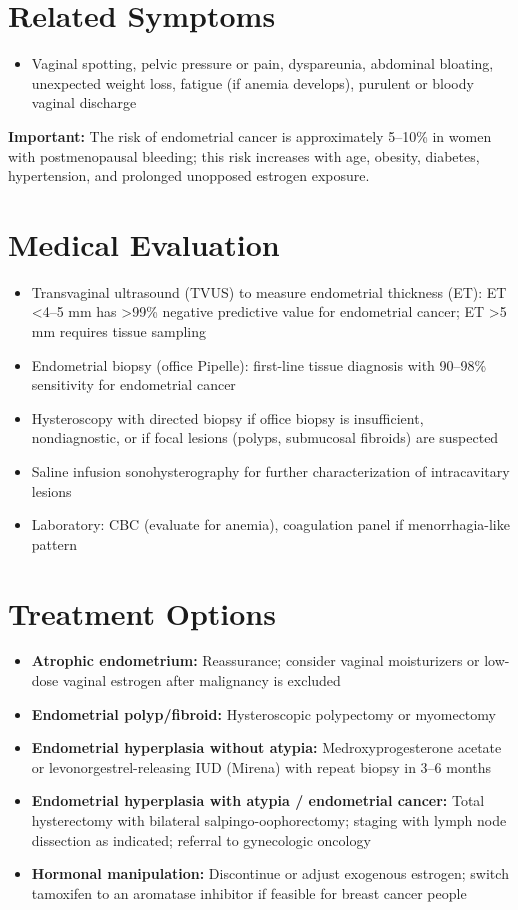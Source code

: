 \section*{Related Symptoms}
\begin{itemize}
  \item Vaginal spotting, pelvic pressure or pain, dyspareunia, abdominal bloating, unexpected weight loss, fatigue (if anemia develops), purulent or bloody vaginal discharge
\end{itemize}
\textbf{Important:} The risk of endometrial cancer is approximately 5--10\% in women with postmenopausal bleeding; this risk increases with age, obesity, diabetes, hypertension, and prolonged unopposed estrogen exposure.

\section*{Medical Evaluation}
\begin{itemize}
  \item Transvaginal ultrasound (TVUS) to measure endometrial thickness (ET): ET \textless{}4--5 mm has \textgreater{}99\% negative predictive value for endometrial cancer; ET \textgreater{}5 mm requires tissue sampling
  \item Endometrial biopsy (office Pipelle): first-line tissue diagnosis with 90--98\% sensitivity for endometrial cancer
  \item Hysteroscopy with directed biopsy if office biopsy is insufficient, nondiagnostic, or if focal lesions (polyps, submucosal fibroids) are suspected
  \item Saline infusion sonohysterography for further characterization of intracavitary lesions
  \item Laboratory: CBC (evaluate for anemia), coagulation panel if menorrhagia-like pattern
\end{itemize}

\section*{Treatment Options}
\begin{itemize}
  \item \textbf{Atrophic endometrium:} Reassurance; consider vaginal moisturizers or low-dose vaginal estrogen after malignancy is excluded
  \item \textbf{Endometrial polyp/fibroid:} Hysteroscopic polypectomy or myomectomy
  \item \textbf{Endometrial hyperplasia without atypia:} Medroxyprogesterone acetate or levonorgestrel-releasing IUD (Mirena) with repeat biopsy in 3--6 months
  \item \textbf{Endometrial hyperplasia with atypia / endometrial cancer:} Total hysterectomy with bilateral salpingo-oophorectomy; staging with lymph node dissection as indicated; referral to gynecologic oncology
  \item \textbf{Hormonal manipulation:} Discontinue or adjust exogenous estrogen; switch tamoxifen to an aromatase inhibitor if feasible for breast cancer people
\end{itemize}

